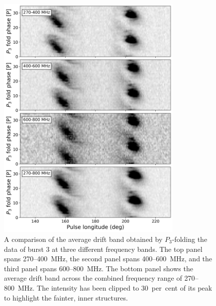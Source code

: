 \begin{figure}
    \begin{center}
        \includegraphics[width=0.8\textwidth]{Figures/J1926/p3_folds3}
        \caption[The average drift bands of PSR~J1926$-$0652 at different frequencies.]{A comparison of the average drift band obtained by $P_3$-folding the data of burst 3 at three different frequency bands. The top panel spans 270--400~MHz, the second panel spans 400--600~MHz, and the third panel spans 600--800~MHz. The bottom panel shows the average drift band across the combined frequency range of 270--800~MHz. The intensity has been clipped to 30~per~cent of its peak to highlight the fainter, inner structures.}
        \label{fig: J1926 - p3 folds}
    \end{center}
\end{figure}

